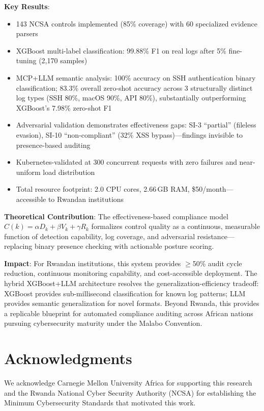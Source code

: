 \documentclass[11pt,conference]{IEEEtran}
\begin{document}
\textbf{Key Results}:
\begin{itemize}
    \item 143 NCSA controls implemented (85\% coverage) with 60 specialized evidence parsers
    \item XGBoost multi-label classification: 99.88\% F1 on real logs after 5\% fine-tuning (2,170 samples)
    \item MCP+LLM semantic analysis: 100\% accuracy on SSH authentication binary classification; 83.3\% overall zero-shot accuracy across 3 structurally distinct log types (SSH 80\%, macOS 90\%, API 80\%), substantially outperforming XGBoost's 7.98\% zero-shot F1
    \item Adversarial validation demonstrates effectiveness gaps: SI-3 ``partial'' (fileless evasion), SI-10 ``non-compliant'' (32\% XSS bypass)---findings invisible to presence-based auditing
    \item Kubernetes-validated at 300 concurrent requests with zero failures and near-uniform load distribution
    \item Total resource footprint: 2.0 CPU cores, 2.66\,GB RAM, \$50/month---accessible to Rwandan institutions
\end{itemize}

\textbf{Theoretical Contribution}: The effectiveness-based compliance model $C(k) = \alpha D_k + \beta V_k + \gamma R_k$ formalizes control quality as a continuous, measurable function of detection capability, log coverage, and adversarial resistance---replacing binary presence checking with actionable posture scoring.

\textbf{Impact}: For Rwandan institutions, this system provides $\geq$50\% audit cycle reduction, continuous monitoring capability, and cost-accessible deployment. The hybrid XGBoost+LLM architecture resolves the generalization-efficiency tradeoff: XGBoost provides sub-millisecond classification for known log patterns; LLM provides semantic generalization for novel formats. Beyond Rwanda, this provides a replicable blueprint for automated compliance auditing across African nations pursuing cybersecurity maturity under the Malabo Convention.

\section*{Acknowledgments}

We acknowledge Carnegie Mellon University Africa for supporting this research and the Rwanda National Cyber Security Authority (NCSA) for establishing the Minimum Cybersecurity Standards that motivated this work.
\end{document}
